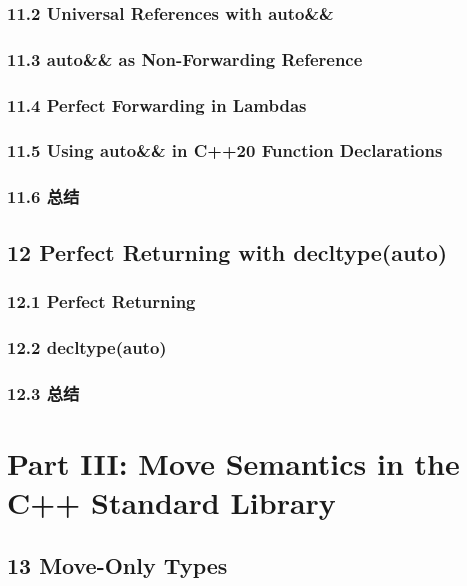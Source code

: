 \documentclass[11pt,a4paper,UTF8]{ctexart}
\begin{document}
		\subsubsection{11.2 Universal References with auto\&\&}
		
		\subsubsection{11.3 auto\&\& as Non-Forwarding Reference}
		
		\subsubsection{11.4 Perfect Forwarding in Lambdas}
		
		\subsubsection{11.5 Using auto\&\& in C++20 Function Declarations}
		
		\subsubsection{11.6 总结}
		
	\subsection{12 Perfect Returning with decltype(auto)}
		\subsubsection{12.1 Perfect Returning}
		\subsubsection{12.2 decltype(auto)}
		\subsubsection{12.3 总结}
		
	\section{Part III: Move Semantics in the C++ Standard Library}
	\subsection{13 Move-Only Types}
\end{document}
